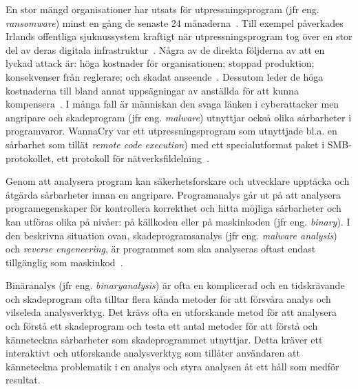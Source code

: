 En stor mängd organisationer har utsats för utpressningsprogram (jfr eng.
\emph{ransomware}) minst en gång de senaste 24 månaderna~\cite{cyberreason2021,
    cyberreason2022}. Till exempel påverkades Irlands offentliga sjuknussystem
kraftigt när utpressningsprogram tog över en stor del av deras digitala
infrastruktur~\cite{hse_report, gallagher2023}.
Några av de direkta följderna av att en lyckad attack är: höga kostnader för
organisationen; stoppad produktion; konsekvenser från reglerare;
och skadat anseende~\cite{cyberreason2021, cyberreason2022}. Dessutom leder
de höga kostnaderna till bland annat uppsägningar av anställda för att kunna
kompensera~\cite{cyberreason2021, cyberreason2022}. I
många fall är människan den svaga länken i cyberattacker men angripare och
skadeprogram (jfr eng. \emph{malware}) utnyttjar också olika sårbarheter i
programvaror. WannaCry var ett utpressningsprogram som utnyttjade bl.a. en
sårbarhet som tillät \emph{remote code execution}) med ett specialutformat
paket i SMB-protokollet, ett protokoll
för nätverksfildelning~\cite{enwiki:1152151996}.


Genom att analysera program kan säkerhetsforskare och utvecklare upptäcka
och åtgärda sårbarheter innan en angripare. Programanalys går ut på att
analysera programegenskaper för kontrollera korrekthet och hitta möjliga
sårbarheter och kan utföras olika på nivåer: på källkoden eller på maskinkoden
(jfr eng. \emph{binary}). I den beskrivna situation ovan, skadeprogramsanalys
(jfr eng. \emph{malware analysis}) och \emph{reverse engeneering}, är
programmet som ska analyseras oftast endast tillgänglig som
maskinkod~\cite{andriesse2018}.

Binäranalys (jfr eng. \emph{binaryanalysis}) är ofta en komplicerad och en
tidskrävande och skadeprogram ofta tilltar flera kända metoder för att försvåra
analys och vilseleda analysverktyg. Det krävs ofta en utforskande metod för att
analysera och förstå ett skadeprogram och testa ett antal metoder för att
förstå och känneteckna sårbarheter som skadeprogrammet utnyttjar. Detta kräver
ett interaktivt och utforskande analysverktyg som tillåter användaren att
känneteckna problematik i en analys och styra analysen åt ett håll som medför
resultat.

